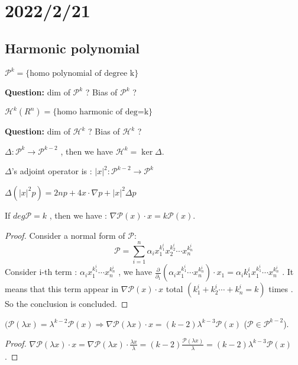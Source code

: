 \section{2022/2/21}

\subsection{Harmonic polynomial}

$\mathcal{P}^k=\{\text{homo polynomial of degree k}\}$
\par
{ \bfseries \large  Question:} dim of $\mathcal{P}^k$ ? Bias of $\mathcal{P}^k$ ?
\par
$\mathcal{H}^k(R^n)=\{\text{homo harmonic of deg=k}\}$
\par
{ \bfseries \large  Question:} dim of $\mathcal{H}^k$ ? Bias of $\mathcal{H}^k$ ?
\par
$\Delta :\mathcal{P}^k\rightarrow \mathcal{P}^{k-2}$ , then we have $\mathcal{H}^k=\ker \Delta$.
\par
$\Delta$'s adjoint operator is : $|x|^2:\mathcal{P}^{k-2}\rightarrow \mathcal{P}^k $
\par
$\Delta(|x|^2 p)=2np+4x\cdot\nabla p+|x|^2\Delta p$
\par
If $deg{\mathcal{P}}=k$ , then we have : $\nabla \mathcal{P}(x)\cdot x=k\mathcal{P}(x) $.
\begin{proof}
    Consider a normal form of $\mathcal{P}$:
    \begin{equation*}
        \mathcal{P}=\sum_{i=1}^n \alpha_i x_1^{k_1^i} x_2^{k_2^i}\cdots x_n^{k_n^i}
    \end{equation*}
    Consider i-th term : $\alpha_ix_1^{k_1^i}\cdots x_n^{k_n^i}$ , we have $\frac{\partial}{\partial _1}(\alpha_ix_1^{k_1^i}\cdots x_n^{k_n^i})\cdot x_1=\alpha_i k_1^i x_1^{k_1^i}\cdots x_n^{k_n^i}$ . It means that this term appear in $\nabla\mathcal{P}(x)\cdot x$ total $(k_1^i+k_2^i\cdots+k_n^i=k)$ times . So the conclusion is concluded.
\end{proof}
$(\mathcal{P}(\lambda x)=\lambda^{k-2}\mathcal{P}(x)\Rightarrow \nabla \mathcal{P}(\lambda x)\cdot x=(k-2)\lambda^{k-3}\mathcal{P}(x)$ ($\mathcal{P}\in \mathcal{P}^{k-2}$).
\begin{proof}
    $\nabla \mathcal{P}(\lambda x) \cdot x = \nabla \mathcal{P}(\lambda x) \cdot \frac{\lambda x}{\lambda}=(k-2)\frac{\mathcal{P}(\lambda x)}{\lambda}=(k-2)\lambda^{k-3}\mathcal{P}(x)$.
\end{proof}

